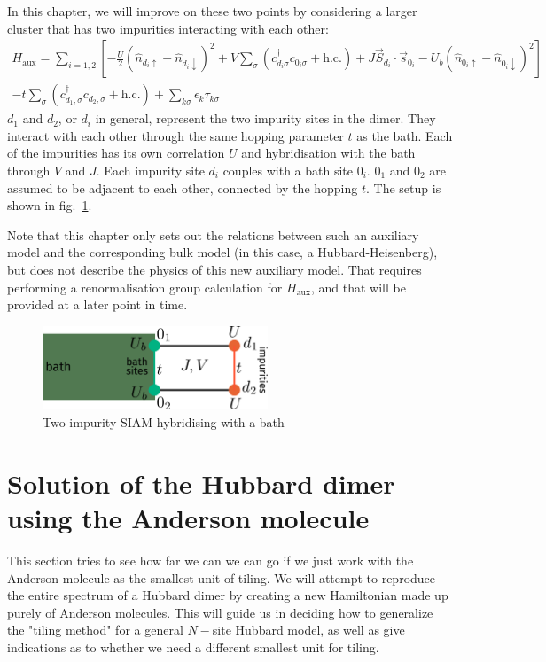 \documentclass{report}
\numberwithin{equation}{section}
\begin{document}
In this chapter, we will improve on these two points by considering a larger cluster that has two impurities interacting with each other:
\begin{equation}\begin{aligned}
	\label{dimer_ham}
	H_\text{aux} = \sum_{i=1,2} \left[- \frac{U}{2}\left(\hat n_{d_i \uparrow} - \hat n_{d_i \downarrow}\right)^2 + V\sum_{\sigma}\left(c^\dagger_{d_i\sigma}c_{0_i\sigma} + \text{h.c.}\right) + J \vec{S}_{d_i}\cdot\vec{s}_{0_i} - U_b\left(\hat n_{0_i \uparrow} - \hat n_{0_i \downarrow}\right)^2\right]\\
	 -t \sum_\sigma \left(c^\dagger_{d_1,\sigma}c_{d_2,\sigma} + \text{h.c.}\right) + \sum_{k\sigma}\epsilon_k \tau_{k\sigma}
\end{aligned}\end{equation}
\(d_1\) and \(d_2\), or \(d_i\) in general, represent the two impurity sites in the dimer. They interact with each other through the same hopping parameter \(t\) as the bath. Each of the impurities has its own correlation \(U\) and hybridisation with the bath through \(V\) and \(J\). Each impurity site \(d_i\) couples with a bath site \(0_i\). \(0_1\) and \(0_2\) are assumed to be adjacent to each other, connected by the hopping \(t\). The setup is shown in fig.~\ref{two-imp-cluster}.

Note that this chapter only sets out the relations between such an auxiliary model and the corresponding bulk model (in this case, a Hubbard-Heisenberg), but does not describe the physics of this new auxiliary model. That requires performing a renormalisation group calculation for \(H_\text{aux}\), and that will be provided at a later point in time.

\begin{figure}[!htb]
	\centering
	\includegraphics[width=0.6\textwidth]{../figures/two-site-cluster.pdf}
	\caption{Two-impurity SIAM hybridising with a bath}
	\label{two-imp-cluster}
\end{figure}

\section{Solution of the Hubbard dimer using the Anderson molecule}
This section tries to see how far we can we can go if we just work with the Anderson molecule as the smallest unit of tiling. We will attempt to reproduce the entire spectrum of a Hubbard dimer by creating a new Hamiltonian made up purely of Anderson molecules. This will guide us in deciding how to generalize the "tiling method" for a general $N-$site Hubbard model, as well as give indications as to whether we need a different smallest unit for tiling.
\end{document}
